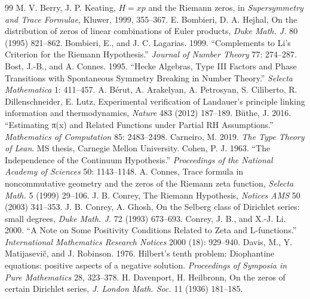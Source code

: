 \documentclass[10pt,twocolumn]{article}
\begin{document}
\begin{thebibliography}{99}
\footnotesize
{} M. V. Berry, J. P. Keating, $H = xp$ and the Riemann zeros, in \emph{Supersymmetry and Trace Formulae}, Kluwer, 1999, 355--367.
 E. Bombieri, D. A. Hejhal, On the distribution of zeros of linear combinations of Euler products, \emph{Duke Math. J.} 80 (1995) 821--862.
 Bombieri, E., and J. C. Lagarias. 1999. ``Complements to Li's Criterion for the Riemann Hypothesis.'' \emph{Journal of Number Theory} 77: 274--287.
 Bost, J.-B., and A. Connes. 1995. ``Hecke Algebras, Type III Factors and Phase Transitions with Spontaneous Symmetry Breaking in Number Theory.'' \emph{Selecta Mathematica} 1: 411--457.
 A. B\'erut, A. Arakelyan, A. Petrosyan, S. Ciliberto, R. Dillenschneider, E. Lutz, Experimental verification of Landauer's principle linking information and thermodynamics, \emph{Nature} 483 (2012) 187--189.
 Büthe, J. 2016. ``Estimating π(x) and Related Functions under Partial RH Assumptions.'' \emph{Mathematics of Computation} 85: 2483--2498.
 Carneiro, M. 2019. \emph{The Type Theory of Lean}. MS thesis, Carnegie Mellon University.
 Cohen, P. J. 1963. ``The Independence of the Continuum Hypothesis.'' \emph{Proceedings of the National Academy of Sciences} 50: 1143--1148.
 A. Connes, Trace formula in noncommutative geometry and the zeros of the Riemann zeta function, \emph{Selecta Math.} 5 (1999) 29--106.
 J. B. Conrey, The Riemann Hypothesis, \emph{Notices AMS} 50 (2003) 341--353.
 J. B. Conrey, A. Ghosh, On the Selberg class of Dirichlet series: small degrees, \emph{Duke Math. J.} 72 (1993) 673--693.
 Conrey, J. B., and X.-J. Li. 2000. ``A Note on Some Positivity Conditions Related to Zeta and L-functions.'' \emph{International Mathematics Research Notices} 2000 (18): 929--940.
 Davis, M., Y. Matijasevič, and J. Robinson. 1976. Hilbert's tenth problem: Diophantine equations: positive aspects of a negative solution. \emph{Proceedings of Symposia in Pure Mathematics} 28, 323--378.
 H. Davenport, H. Heilbronn, On the zeros of certain Dirichlet series, \emph{J. London Math. Soc.} 11 (1936) 181--185.

\end{thebibliography}
\end{document}
